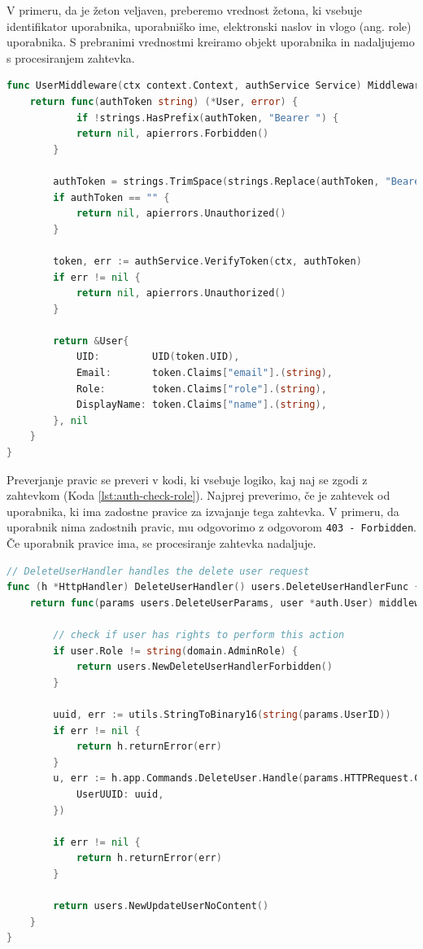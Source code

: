 \documentclass[a4paper, 12pt]{book}
\begin{document}
V primeru, da je žeton veljaven, preberemo vrednost žetona, ki vsebuje identifikator uporabnika, uporabniško ime, elektronski naslov in vlogo (ang. role) uporabnika. S prebranimi vrednostmi kreiramo objekt uporabnika in nadaljujemo s procesiranjem zahtevka.

  \begin{lstlisting}[language=go,style=mystyle,caption={Izsek kode za preverjanje pristnosti uporabnika},label=lst:auth-middleware]
func UserMiddleware(ctx context.Context, authService Service) MiddlewareFunc {
	return func(authToken string) (*User, error) {
			if !strings.HasPrefix(authToken, "Bearer ") {
			return nil, apierrors.Forbidden()
		}

		authToken = strings.TrimSpace(strings.Replace(authToken, "Bearer", "", 1))
		if authToken == "" {
			return nil, apierrors.Unauthorized()
		}

		token, err := authService.VerifyToken(ctx, authToken)
		if err != nil {
			return nil, apierrors.Unauthorized()
		}
		
		return &User{
			UID:         UID(token.UID),
			Email:       token.Claims["email"].(string),
			Role:        token.Claims["role"].(string),
			DisplayName: token.Claims["name"].(string),
		}, nil
	}
}
\end{lstlisting}

Preverjanje pravic se preveri v kodi, ki vsebuje logiko, kaj naj se zgodi z zahtevkom (Koda \ref{lst:auth-check-role}). Najprej preverimo, če je zahtevek od uporabnika, ki ima zadostne pravice za izvajanje tega zahtevka. V primeru, da uporabnik nima zadostnih pravic, mu odgovorimo z odgovorom \verb=403 - Forbidden=. Če uporabnik pravice ima, se procesiranje zahtevka nadaljuje.

\clearpage
\begin{lstlisting}[language=go,style=mystyle,caption={Izsek kode za preverjanje pravic uporabnika},label=lst:auth-check-role]
// DeleteUserHandler handles the delete user request
func (h *HttpHandler) DeleteUserHandler() users.DeleteUserHandlerFunc {
	return func(params users.DeleteUserParams, user *auth.User) middleware.Responder {

		// check if user has rights to perform this action
		if user.Role != string(domain.AdminRole) {
			return users.NewDeleteUserHandlerForbidden()
		}

		uuid, err := utils.StringToBinary16(string(params.UserID))
		if err != nil {
			return h.returnError(err)
		}
		u, err := h.app.Commands.DeleteUser.Handle(params.HTTPRequest.Context(), command.DeleteParamsCmd{
			UserUUID: uuid,
		})

		if err != nil {
			return h.returnError(err)
		}

		return users.NewUpdateUserNoContent()
	}
}
\end{lstlisting}
\clearpage
\end{document}
